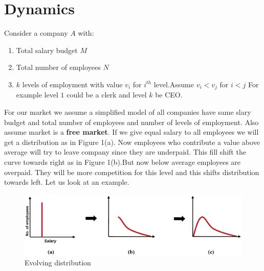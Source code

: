 \documentclass[letterpaper,english,10pt]{article}
\begin{document}
\section{Dynamics} \cite{fairentrop}

 Consider a company $A$ with:
\begin{enumerate}
	 \item Total salary budget $M$ 
	 \item Total number of employees $N$
	 \item $k$ levels of employment with value $v_i$ for $i^{th}$ level.Assume $v_i < v_j$ for $i<j$
	 For example level $1$ could be a clerk and level $k$ be CEO.
\end{enumerate}

For our market we assume a simplified model of all companies have same  slary budget and total number of employees and number of levels of employment. Also assume market is a \textbf{free market}.
If we give equal salary to all employees we will get a distribution as in Figure 1(a). Now employees who contribute a value above average will try to leave company since they are underpaid. This fill shift the curve towards right as in Figure 1(b).But now below average employees are overpaid. They will be more competition for this level and this shifts distribution towards left.
Let us look at an example.
\begin{figure}[h!]
	\includegraphics[width=\linewidth]{dbnR.png}
	\caption{Evolving distribution}
	\label{fig:1}
\end{figure}
\end{document}
